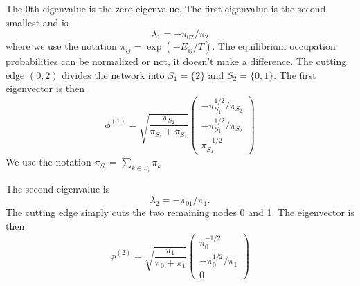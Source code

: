 \documentclass[a4paper]{article}
\begin{document}
The 0th eigenvalue is the zero eigenvalue.  The first eigenvalue is the second smallest and is
\begin{equation}
\lambda_1 = - \pi_{02} / \pi_2
\end{equation}  
where we use the notation $\pi_{ij} = \exp (-E_{ij} / T)$.
The equilibrium occupation probabilities can be normalized or not, it doesn't make a difference.
The cutting edge $(0,2)$ divides the network into $S_1 = \{2\}$ and $S_2 = \{0,1\}$.  The first
eigenvector is then
\begin{equation}
\phi^{(1)} = \sqrt{ \frac{\pi_{S_2}}{\pi_{S_1} + \pi_{S_2}}}
\begin{pmatrix}
-\pi_{S_1}^{1/2} / \pi_{S_2} \\
-\pi_{S_1}^{1/2} / \pi_{S_2} \\
\pi_{S_1}^{-1/2}
\end{pmatrix}
\end{equation}
We use the notation $\pi_{S_i} = \sum_{k \in S_i} \pi_k$

The second eigenvalue is 
\begin{equation}
\lambda_2 = -\pi_{01} / \pi_1
.
\end{equation} 
The cutting edge simply cuts the two remaining nodes 0 and 1.
The eigenvector is then
\begin{equation}
\phi^{(2)} = \sqrt{ \frac{\pi_{1}}{\pi_{0} + \pi_{1}}}
\begin{pmatrix}
\pi_{0}^{-1/2} \\
-\pi_{0}^{1/2} / \pi_{1} \\
0
\end{pmatrix}
\end{equation}
\end{document}
